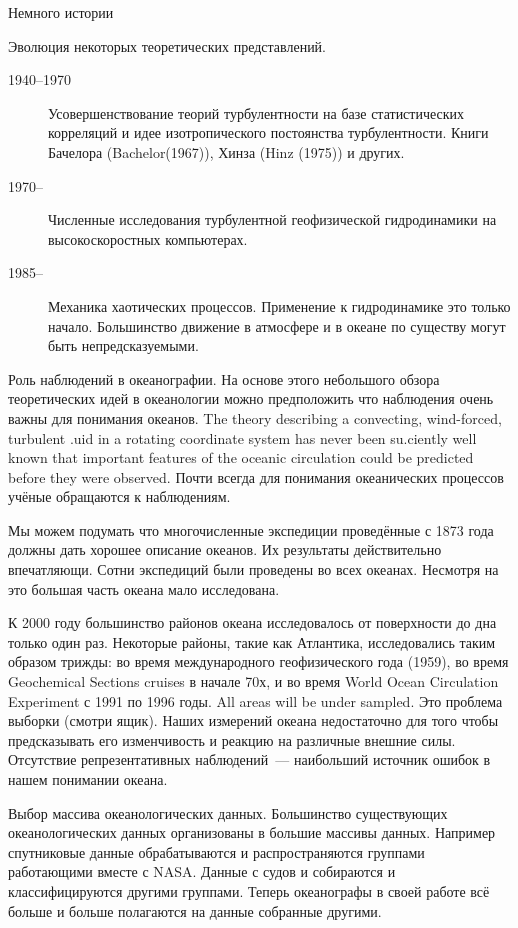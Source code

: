 \begin{chapter}{Немного истории}
\begin{section}{Эволюция некоторых теоретических представлений.}
\begin{description}
\item[1940--1970] Усовершенствование теорий турбулентности на базе
статистических корреляций и идее изотропического постоянства
турбулентности. Книги Бачелора (Bachelor(1967)), Хинза (Hinz (1975)) и
других.

\item[1970--] Численные исследования турбулентной геофизической
гидродинамики на высокоскоростных компьютерах.

\item[1985--] Механика хаотических процессов. Применение к
гидродинамике это только начало. Большинство движение в атмосфере и в
океане по существу могут быть непредсказуемыми.
\end{description}
\end{section}

\begin{section}{Роль наблюдений в океанографии.}
На основе этого небольшого обзора теоретических идей в океанологии
можно предположить что наблюдения очень важны для понимания
океанов. The theory describing a convecting, wind-forced, turbulent
.uid in a rotating coordinate system has never been su.ciently well
known that important features of the oceanic circulation could be
predicted before they were observed. Почти всегда для понимания
океанических процессов учёные обращаются к наблюдениям.

Мы можем подумать что многочисленные экспедиции проведённые с 1873
года должны дать хорошее описание океанов. Их результаты действительно
впечатляющи. Сотни экспедиций были проведены во всех океанах. Несмотря
на это большая часть океана мало исследована.

К 2000 году большинство районов океана исследовалось от поверхности до
дна только один раз. Некоторые районы, такие как Атлантика,
исследовались таким образом трижды: во время международного
геофизического года (1959), во время Geochemical Sections cruises в
начале 70х, и во время World Ocean Circulation Experiment с 1991 по
1996 годы. All areas will be under sampled. Это проблема выборки
(смотри ящик). Наших измерений океана недостаточно для того чтобы
предсказывать его изменчивость и реакцию на различные внешние
силы. Отсутствие репрезентативных наблюдений~--- наибольший источник
ошибок в нашем понимании океана.

Выбор массива океанологических данных. Большинство существующих
океанологических данных организованы в большие массивы
данных. Например спутниковые данные обрабатываются и распространяются
группами работающими вместе с NASA. Данные с судов и собираются и
классифицируются другими группами. Теперь океанографы в своей работе
всё больше и больше полагаются на данные собранные другими.


\end{section}
\end{chapter}
